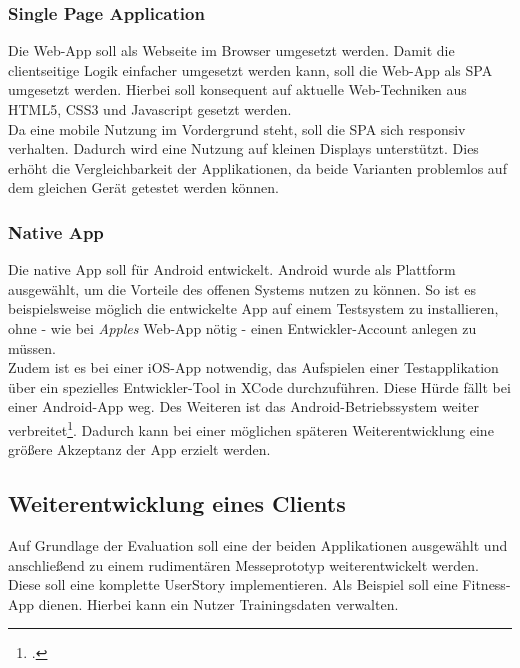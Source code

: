 \subsubsection*{Single Page Application}
\label{ssec:aufgabenstellung:spa}
Die \ac{Web-App} soll als Webseite im Browser umgesetzt werden. Damit die clientseitige Logik einfacher umgesetzt werden kann, soll die \ac{Web-App} als \ac{SPA} umgesetzt werden. Hierbei soll konsequent auf aktuelle Web-Techniken aus \gls{HTML5}, \gls{CSS3} und \gls{Javascript} gesetzt werden. \\
Da eine mobile Nutzung im Vordergrund steht, soll die \ac{SPA} sich \gls{responsiv} verhalten. Dadurch wird eine Nutzung auf kleinen Displays unterstützt. Dies erhöht die Vergleichbarkeit der Applikationen, da beide Varianten problemlos auf dem gleichen Gerät getestet werden können.
\subsubsection*{Native App}
\label{ssec:aufgabenstellung:nat-app}
Die native \gls{App} soll für \gls{Android} entwickelt. \gls{Android} wurde als Plattform ausgewählt, um die Vorteile des offenen Systems nutzen zu können. So ist es beispielsweise möglich die entwickelte App auf einem Testsystem zu installieren, ohne - wie bei \textit{Apples} \ac{Web-App} nötig - einen Entwickler-Account anlegen zu müssen.\\ 
Zudem ist es bei einer \gls{iOS}-\gls{App} notwendig, das Aufspielen einer Testapplikation über ein spezielles Entwickler-Tool in \gls{XCode} durchzuführen. Diese Hürde fällt bei einer \gls{Android}-\gls{App} weg. Des Weiteren ist das \gls{Android}-Betriebssystem weiter verbreitet\footcite{Statista-SmartphoneVerteilung}. Dadurch kann bei einer möglichen späteren Weiterentwicklung eine größere Akzeptanz der \gls{App} erzielt werden.
\subsection{Weiterentwicklung eines Clients}
\label{ssec:umsetzung-client-entwicklung}
Auf Grundlage der Evaluation soll eine der beiden Applikationen ausgewählt und anschließend zu einem rudimentären Messeprototyp weiterentwickelt werden. Diese soll eine komplette \gls{UserStory} implementieren. Als Beispiel soll eine Fitness-\gls{App} dienen. Hierbei kann ein Nutzer Trainingsdaten verwalten. 
